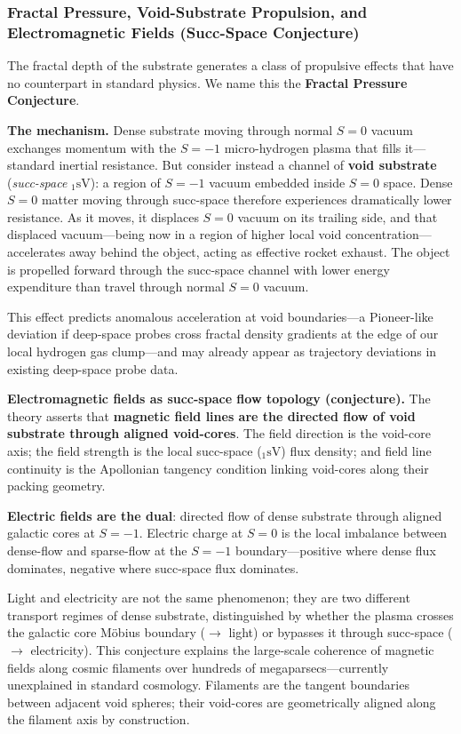 \documentclass[11pt,letterpaper]{article}
\newcommand{\Sd}[2]{{}_{#1}\mathrm{s}\mathrm{#2}}
\begin{document}
\subsubsection{Fractal Pressure, Void-Substrate Propulsion, and Electromagnetic
Fields (Succ-Space Conjecture)}
\label{sec:succ_space}
The fractal depth of the substrate generates a class of propulsive effects that
have no counterpart in standard physics. We name this the \textbf{Fractal Pressure
Conjecture}.

\textbf{The mechanism.}
Dense substrate moving through normal $S{=}0$ vacuum exchanges momentum with the
$S{=}{-1}$ micro-hydrogen plasma that fills it---standard inertial resistance. But
consider instead a channel of \textbf{void substrate} (\textit{succ-space}
$\Sd{1}{V}$): a region of $S{=}{-1}$ vacuum embedded inside $S{=}0$ space. Dense
$S{=}0$ matter moving through succ-space therefore experiences dramatically lower
resistance. As it moves, it displaces $S{=}0$ vacuum on its trailing side, and that
displaced vacuum---being now in a region of higher local void
concentration---accelerates away behind the object, acting as effective rocket
exhaust. The object is propelled forward through the succ-space channel with lower
energy expenditure than travel through normal $S{=}0$ vacuum.

This effect predicts anomalous acceleration at void boundaries---a Pioneer-like
deviation if deep-space probes cross fractal density gradients at the edge of our
local hydrogen gas clump---and may already appear as trajectory deviations in
existing deep-space probe data.

\textbf{Electromagnetic fields as succ-space flow topology (conjecture).}
The theory asserts that \textbf{magnetic field lines are the directed flow of void
substrate through aligned void-cores}. The field direction is the void-core axis;
the field strength is the local succ-space ($\Sd{1}{V}$) flux density; and field
line continuity is the Apollonian tangency condition linking void-cores along their
packing geometry.

\textbf{Electric fields are the dual}: directed flow of dense substrate through
aligned galactic cores at $S{=}{-1}$. Electric charge at $S{=}0$ is the local
imbalance between dense-flow and sparse-flow at the $S{=}{-1}$ boundary---positive
where dense flux dominates, negative where succ-space flux dominates.

Light and electricity are not the same phenomenon; they are two different transport
regimes of dense substrate, distinguished by whether the plasma crosses the galactic
core M\"obius boundary ($\to$ light) or bypasses it through succ-space ($\to$
electricity). This conjecture explains the large-scale coherence of magnetic fields
along cosmic filaments over hundreds of megaparsecs---currently unexplained in
standard cosmology. Filaments are the tangent boundaries between adjacent void
spheres; their void-cores are geometrically aligned along the filament axis by
construction.
\end{document}
